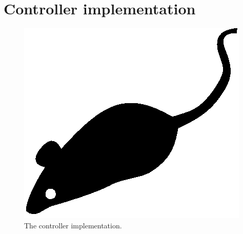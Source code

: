 \section{Controller implementation}
\label{sec:controller-implementation}

\lipsum[1]

\begin{figure}[tp]
	\centering
	\includegraphics{./fig/acmlarge-mouse}
	\caption{The controller implementation.}
		\label{fig:controller-implementation}
\end{figure}

\lipsum[1]
